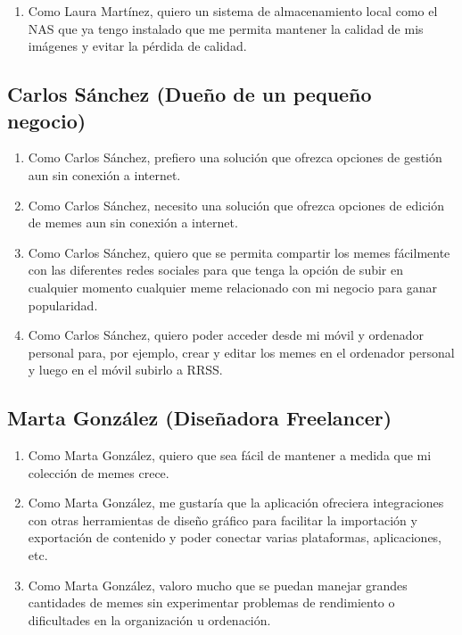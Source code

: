     \begin{enumerate}
        \item Como Laura Martínez, quiero un sistema de almacenamiento local como el NAS que ya tengo instalado que me permita mantener la calidad de mis imágenes y evitar la pérdida de calidad.
    \end{enumerate}

\subsection{Carlos Sánchez (Dueño de un pequeño negocio)}

    \begin{enumerate}
        \item Como Carlos Sánchez, prefiero una solución que ofrezca opciones de gestión aun sin conexión a internet.
        \item Como Carlos Sánchez, necesito una solución que ofrezca opciones de edición de memes aun sin conexión a internet.
        \item Como Carlos Sánchez, quiero que se permita compartir los memes fácilmente con las diferentes redes sociales para que tenga la opción de subir en cualquier momento cualquier meme relacionado con mi negocio para ganar popularidad.
        \item Como Carlos Sánchez, quiero poder acceder desde mi móvil y ordenador personal para, por ejemplo, crear y editar los memes en el ordenador personal y luego en el móvil subirlo a RRSS.
    \end{enumerate}

\subsection{Marta González (Diseñadora Freelancer)}

    \begin{enumerate}
        \item Como Marta González, quiero que sea fácil de mantener a medida que mi colección de memes crece.
        \item Como Marta González, me gustaría que la aplicación ofreciera integraciones con otras herramientas de diseño gráfico para facilitar la importación y exportación de contenido y poder conectar varias plataformas, aplicaciones, etc.
        \item Como Marta González, valoro mucho que se puedan manejar grandes cantidades de memes sin experimentar problemas de rendimiento o dificultades en la organización u ordenación.
    \end{enumerate}


